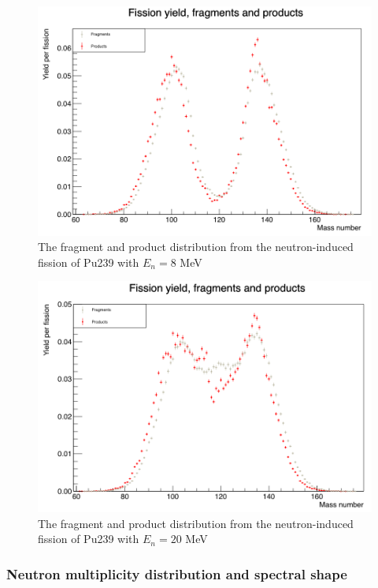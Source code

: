 \documentclass[]{article}
\begin{document}
\begin{figure} [H]
	\centering
	\includegraphics[scale=0.36]{Pu239_8_fragment_product.png}
	\caption{The fragment and product distribution from the neutron-induced fission of Pu239 with $E_n = 8$ MeV}
	\label{fig:Pu239_8_fragment_product}
\end{figure}

\begin{figure} [H]
	\centering
	\includegraphics[scale=0.36]{Pu239_20_fragment_products.png}
	\caption{The fragment and product distribution from the neutron-induced fission of Pu239 with $E_n = 20$ MeV}
	\label{fig:Pu239_20_fragment_product}
\end{figure}

\subsubsection{Neutron multiplicity distribution and spectral shape}
\end{document}
